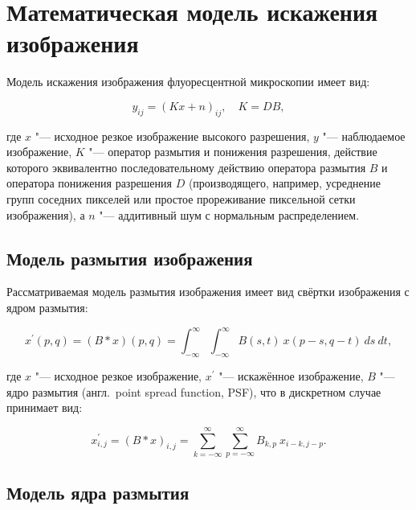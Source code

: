 \section{Математическая модель искажения изображения}

Модель искажения изображения флуоресцентной микроскопии имеет вид:

\begin{equation*}
	y_{ij} = \left(Kx+n\right)_{ij},\quad K=DB,
\end{equation*}

\noindent где $x$ "--- исходное резкое изображение высокого разрешения, $y$ "--- наблюдаемое изображение, $K$ "--- оператор размытия и понижения разрешения, действие которого эквивалентно последовательному действию оператора размытия $B$ и оператора понижения разрешения $D$ (производящего, например, усреднение групп соседних пикселей или простое прореживание пиксельной сетки изображения), а $n$ "--- аддитивный шум с нормальным распределением.

\subsection{Модель размытия изображения} \label{sec:image-blur-model}

Рассматриваемая модель размытия изображения имеет вид свёртки изображения с ядром размытия:

\begin{equation*}
	x^\prime \left(p, q\right) = \left(B \ast x\right) \left(p, q\right) = \int_{-\infty}^{\infty}\int_{-\infty}^{\infty}{B\left(s,t\right)\ x\left(p-s,q-t\right)\ ds\ dt},
\end{equation*}

\noindent где $x$ "--- исходное резкое изображение, $x^\prime$ "--- искажённое изображение, $B$ "--- ядро размытия (англ.~point spread function, PSF), что в дискретном случае принимает вид:

\begin{equation*}
	x^\prime_{i,j} = \left(B \ast x\right)_{i,j} = \sum_{k=-\infty}^{\infty} \sum_{p=-\infty}^{\infty}{B_{k,p}\ x_{i-k,j-p}}.
\end{equation*}

\subsection{Модель ядра размытия} \label{sec:microscope-psf}

